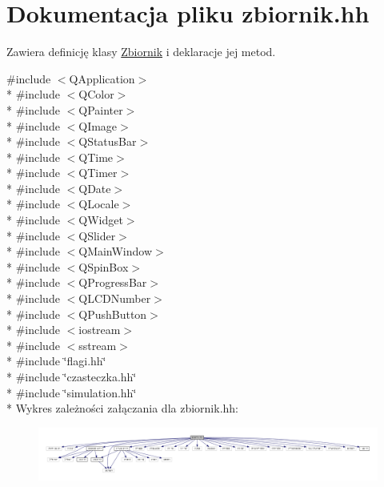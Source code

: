\hypertarget{zbiornik_8hh}{}\section{Dokumentacja pliku zbiornik.\+hh}
\label{zbiornik_8hh}


Zawiera definicję klasy \hyperlink{class_zbiornik}{Zbiornik} i deklaracje jej metod.  


{\ttfamily \#include $<$Q\+Application$>$}\\*
{\ttfamily \#include $<$Q\+Color$>$}\\*
{\ttfamily \#include $<$Q\+Painter$>$}\\*
{\ttfamily \#include $<$Q\+Image$>$}\\*
{\ttfamily \#include $<$Q\+Status\+Bar$>$}\\*
{\ttfamily \#include $<$Q\+Time$>$}\\*
{\ttfamily \#include $<$Q\+Timer$>$}\\*
{\ttfamily \#include $<$Q\+Date$>$}\\*
{\ttfamily \#include $<$Q\+Locale$>$}\\*
{\ttfamily \#include $<$Q\+Widget$>$}\\*
{\ttfamily \#include $<$Q\+Slider$>$}\\*
{\ttfamily \#include $<$Q\+Main\+Window$>$}\\*
{\ttfamily \#include $<$Q\+Spin\+Box$>$}\\*
{\ttfamily \#include $<$Q\+Progress\+Bar$>$}\\*
{\ttfamily \#include $<$Q\+L\+C\+D\+Number$>$}\\*
{\ttfamily \#include $<$Q\+Push\+Button$>$}\\*
{\ttfamily \#include $<$iostream$>$}\\*
{\ttfamily \#include $<$sstream$>$}\\*
{\ttfamily \#include \char`\"{}flagi.\+hh\char`\"{}}\\*
{\ttfamily \#include \char`\"{}czasteczka.\+hh\char`\"{}}\\*
{\ttfamily \#include \char`\"{}simulation.\+hh\char`\"{}}\\*
Wykres zależności załączania dla zbiornik.\+hh\+:\nopagebreak
\begin{figure}[H]
\begin{center}
\leavevmode
\includegraphics[width=350pt]{zbiornik_8hh__incl}
\end{center}
\end{figure}
